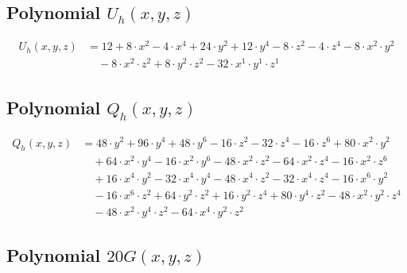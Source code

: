 \subsection{Polynomial $U_h(x,y,z)$}
\begin{align*}U_h(x,y,z)&=12+8\cdot x^{2}-4\cdot x^{4}+24\cdot y^{2}+12\cdot y^{4}-8\cdot z^{2}-4\cdot z^{4}-8\cdot x^{2}\cdot y^{2}\\
&\quad -8\cdot x^{2}\cdot z^{2}+8\cdot y^{2}\cdot z^{2}-32\cdot x^{1}\cdot y^{1}\cdot z^{1}\end{align*}\subsection{Polynomial $Q_h(x,y,z)$}
\begin{align*}Q_h(x,y,z)&=48\cdot y^{2}+96\cdot y^{4}+48\cdot y^{6}-16\cdot z^{2}-32\cdot z^{4}-16\cdot z^{6}+80\cdot x^{2}\cdot y^{2}\\
&\quad +64\cdot x^{2}\cdot y^{4}-16\cdot x^{2}\cdot y^{6}-48\cdot x^{2}\cdot z^{2}-64\cdot x^{2}\cdot z^{4}-16\cdot x^{2}\cdot z^{6}\\
&\quad +16\cdot x^{4}\cdot y^{2}-32\cdot x^{4}\cdot y^{4}-48\cdot x^{4}\cdot z^{2}-32\cdot x^{4}\cdot z^{4}-16\cdot x^{6}\cdot y^{2}\\
&\quad -16\cdot x^{6}\cdot z^{2}+64\cdot y^{2}\cdot z^{2}+16\cdot y^{2}\cdot z^{4}+80\cdot y^{4}\cdot z^{2}-48\cdot x^{2}\cdot y^{2}\cdot z^{4}\\
&\quad -48\cdot x^{2}\cdot y^{4}\cdot z^{2}-64\cdot x^{4}\cdot y^{2}\cdot z^{2}\end{align*}\subsection{Polynomial $20G(x,y,z)$}
